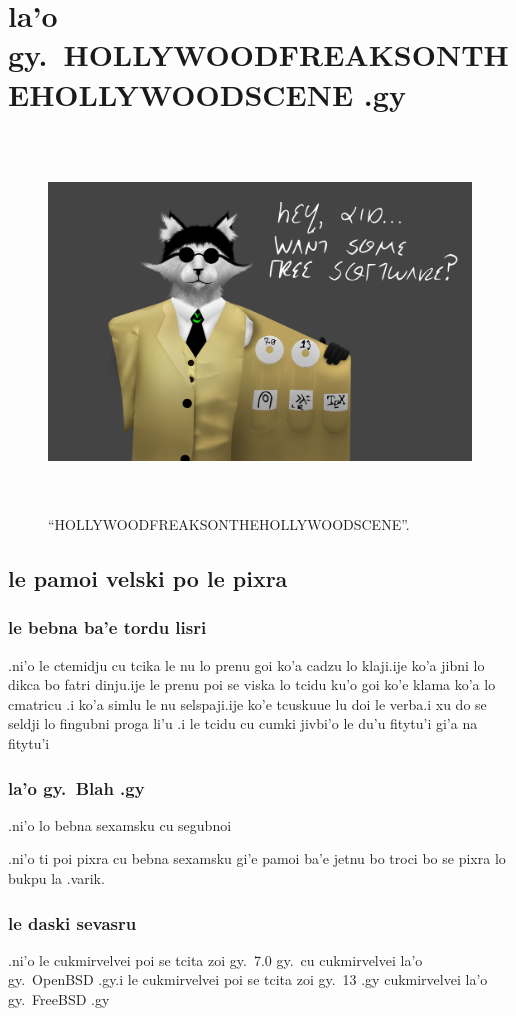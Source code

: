 \documentclass{report}
\newcommand\imageheight{10cm}
\begin{document}
\chapter{la'o gy.\ HOLLYWOODFREAKSONTHEHOLLYWOODSCENE .gy}
\begin{figure}[ht]
	\centering
	\includegraphics[height=\imageheight]{hollywoodfreaksonthehollywoodscene/hollywoodfreaksonthehollywoodscene.png}
	\caption[center]{``HOLLYWOODFREAKSONTHEHOLLYWOODSCENE''.}
\end{figure}
\section{le pamoi velski po le pixra}
\subsection{le bebna ba'e tordu lisri}
.ni'o le ctemidju cu tcika le nu lo prenu goi ko'a cadzu lo klaji\@  .ije ko'a jibni lo dikca bo fatri dinju\@  .ije le prenu poi se viska lo tcidu ku'o goi ko'e klama ko'a lo cmatricu
.i ko'a simlu le nu selspaji\@  .ije ko'e tcuskuue lu doi le verba\@  .i xu do se seldji lo fingubni proga li'u
.i le tcidu cu cumki jivbi'o le du'u fitytu'i gi'a na fitytu'i
\subsection{la'o gy.\ Blah .gy}
.ni'o lo bebna sexamsku cu segubnoi

.ni'o ti poi pixra cu bebna sexamsku gi'e pamoi ba'e jetnu bo troci bo se pixra lo bukpu la .varik.
\subsection{le daski sevasru}
.ni'o le cukmirvelvei poi se tcita zoi gy.\ 7.0 gy.\ cu cukmirvelvei la'o gy.\ OpenBSD .gy\@  .i le cukmirvelvei poi se tcita zoi gy.\ 13 .gy cukmirvelvei la'o gy.\ FreeBSD .gy
\end{document}
